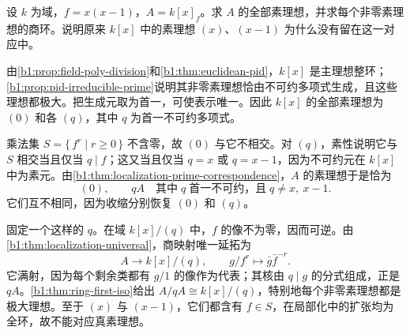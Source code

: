\begin{exercise}\label{b1:ex:13-12}
	设 \(k\) 为域，\(f=x(x-1)\)，\(A=k[x]_f\)。求 \(A\) 的全部素理想，并求每个非零素理想的商环。说明原来 \(k[x]\) 中的素理想 \((x)\)、\((x-1)\) 为什么没有留在这一对应中。
\end{exercise}
\begin{solution}
	由\cref{b1:prop:field-poly-division}和\cref{b1:thm:euclidean-pid}，\(k[x]\) 是主理想整环；\cref{b1:prop:pid-irreducible-prime}说明其非零素理想恰由不可约多项式生成，且这些理想都极大。把生成元取为首一，可使表示唯一。因此 \(k[x]\) 的全部素理想为 \((0)\) 和各 \((q)\)，其中 \(q\) 为首一不可约多项式。

	乘法集 \(S=\{\,f^r\mid r\geq0\,\}\) 不含零，故 \((0)\) 与它不相交。对 \((q)\)，素性说明它与 \(S\) 相交当且仅当 \(q\mid f\)；这又当且仅当 \(q=x\) 或 \(q=x-1\)，因为不可约元在 \(k[x]\) 中为素元。由\cref{b1:thm:localization-prime-correspondence}，\(A\) 的素理想于是恰为
	\[
		(0),\qquad qA \quad\text{其中}\;q\;\text{首一不可约，且}\;q\neq x,\ x-1.
	\]
	它们互不相同，因为收缩分别恢复 \((0)\) 和 \((q)\)。

	固定一个这样的 \(q\)。在域 \(k[x]/(q)\) 中，\(f\) 的像不为零，因而可逆。由\cref{b1:thm:localization-universal}，商映射唯一延拓为
	\[
		A\longrightarrow k[x]/(q),\qquad g/f^r\longmapsto\bar g\bar f^{-r}.
	\]
	它满射，因为每个剩余类都有 \(g/1\) 的像作为代表；其核由 \(q\mid g\) 的分式组成，正是 \(qA\)。\cref{b1:thm:ring-first-iso}给出 \(A/qA\cong k[x]/(q)\)，特别地每个非零素理想都是极大理想。至于 \((x)\) 与 \((x-1)\)，它们都含有 \(f\in S\)，在局部化中的扩张均为全环，故不能对应真素理想。
\end{solution}

